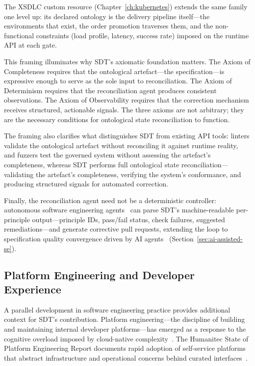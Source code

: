 The XSDLC custom resource (Chapter~\ref{ch:kubernetes}) extends the same family one level up: its declared ontology is the delivery pipeline itself---the environments that exist, the order promotion traverses them, and the non-functional constraints (load profile, latency, success rate) imposed on the runtime API at each gate.

This framing illuminates why SDT's axiomatic foundation matters. The Axiom of Completeness requires that the ontological artefact---the specification---is expressive enough to serve as the sole input to reconciliation. The Axiom of Determinism requires that the reconciliation agent produces consistent observations. The Axiom of Observability requires that the correction mechanism receives structured, actionable signals. The three axioms are not arbitrary; they are the necessary conditions for ontological state reconciliation to function.

The framing also clarifies what distinguishes SDT from existing API tools: linters validate the ontological artefact without reconciling it against runtime reality, and fuzzers test the governed system without assessing the artefact's completeness, whereas SDT performs full ontological state reconciliation---validating the artefact's completeness, verifying the system's conformance, and producing structured signals for automated correction.

Finally, the reconciliation agent need not be a deterministic controller: autonomous software engineering agents~\cite{swe-agent} can parse SDT's machine-readable per-principle output---principle IDs, pass/fail status, check failures, suggested remediations---and generate corrective pull requests, extending the loop to specification quality convergence driven by AI agents~\cite{autonomous-agents-survey} (Section~\ref{sec:ai-assisted-se}).

\subsection{Platform Engineering and Developer Experience}
\label{subsec:platform-engineering}

A parallel development in software engineering practice provides additional context for SDT's contribution. Platform engineering---the discipline of building and maintaining internal developer platforms---has emerged as a response to the cognitive overload imposed by cloud-native complexity~\cite{cncf-platforms}. The Humanitec State of Platform Engineering Report documents rapid adoption of self-service platforms that abstract infrastructure and operational concerns behind curated interfaces~\cite{humanitec-platform-engineering}.

